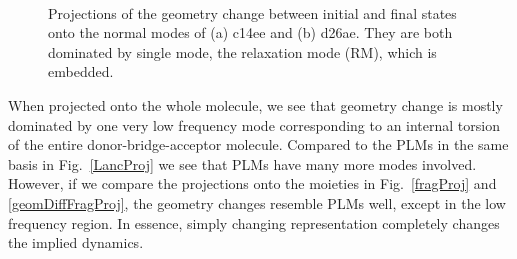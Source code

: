 \begin{figure}[!h]
\\
\caption{Projections of the geometry change between initial and final states onto the normal modes of (a) c14ee and (b) d26ae. They are both dominated by single mode, the relaxation mode (RM), which is embedded.\label{geomDiffProj}}
\end{figure}



When projected onto the whole molecule, we see that geometry change is mostly dominated
by one  very low frequency mode  corresponding to an internal  torsion of the entire donor-bridge-acceptor molecule.
Compared to the PLMs in the same basis in Fig.~\ref{LancProj}
 we see that  PLMs  have many more modes involved.
However, if we compare the projections onto the  moieties in  Fig.~\ref{fragProj}
and \ref{geomDiffFragProj}, the geometry changes resemble PLMs well, except in the low frequency region.
In essence, simply changing representation completely changes the implied dynamics.


